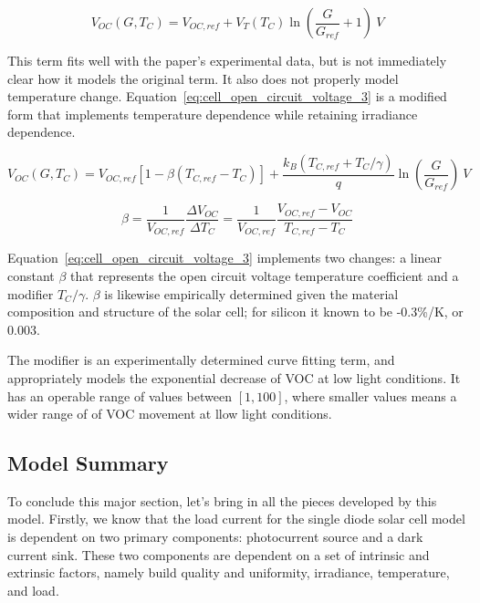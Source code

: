 \begin{equation}
    V_{OC}(G, T_C) = V_{OC,ref} + V_T(T_C)\ln(\frac{G}{G_{ref}} + 1)~V
    \label{eq:cell_open_circuit_voltage_2}
\end{equation}

This term fits well with the paper’s experimental data, but is not immediately
clear how it models the original term. It also does not properly model
temperature change. Equation~\ref{eq:cell_open_circuit_voltage_3} is a modified
form that implements temperature dependence while retaining irradiance
dependence.

\begin{equation}
    V_{OC}(G, T_C) = V_{OC,ref}[1 - \beta (T_{C,ref} - T_C)]
        + \frac{k_B(T_{C,ref} + T_C/\gamma)}{q}\ln(\frac{G}{G_{ref}})~V
    \label{eq:cell_open_circuit_voltage_3}
\end{equation}

\begin{equation}
    \beta = \frac{1}{V_{OC,ref}}\frac{\Delta V_{OC}}{\Delta T_C}
          = \frac{1}{V_{OC,ref}}\frac{V_{OC,ref} - V_{OC}}{T_{C,ref} - T_C}
    \label{eq:thermal_coefficient_beta}
\end{equation}

Equation~\ref{eq:cell_open_circuit_voltage_3} implements two changes: a linear
constant $\beta$ that represents the open circuit voltage temperature
coefficient and a modifier $T_C/\gamma$. $\beta$ is likewise empirically
determined given the material composition and structure of the solar cell; for
silicon it known to be -0.3\%/K, or 0.003.

The modifier is an experimentally determined curve fitting term, and
appropriately models the exponential decrease of \ac{VOC} at low light
conditions. It has an operable range of values between $[1, 100]$, where smaller
values means a wider range of of \ac{VOC} movement at llow light conditions.

\subsection*{Model Summary}

To conclude this major section, let's bring in all the pieces developed by this
model. Firstly, we know that the load current for the single diode solar cell
model is dependent on two primary components: photocurrent source and a dark
current sink. These two components are dependent on a set of intrinsic and
extrinsic factors, namely build quality and uniformity, irradiance, temperature,
and load.

